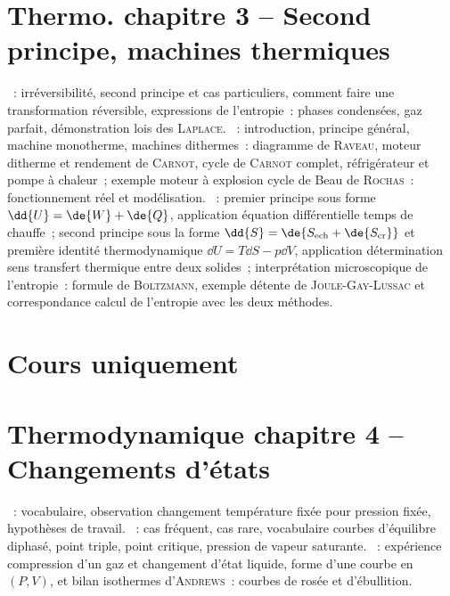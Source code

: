 \documentclass[a4paper, 12pt, final, garamond]{book}
\begin{document}
\section*{Thermo. chapitre 3 -- Second principe, machines thermiques}
\begin{enumerate}[label=\Roman*]
  ~: irréversibilité, second principe et cas particuliers,
    comment faire une transformation réversible, expressions de l'entropie~:
    phases condensées, gaz parfait, démonstration lois des \textsc{Laplace}.
  ~: introduction, principe général, machine
    monotherme, machines dithermes~: diagramme de \textsc{Raveau}, moteur
    ditherme et rendement de \textsc{Carnot}, cycle de \textsc{Carnot} complet,
    réfrigérateur et pompe à chaleur~; exemple moteur à explosion cycle de Beau
    de \textsc{Rochas}~: fonctionnement réel et modélisation.
  ~: premier
    principe sous forme $\dd{U} = \de{W}+\de{Q}$, application équation
    différentielle temps de chauffe~; second principe sous la forme $\dd{S} =
    \de{S_{\rm ech}+\de{S_{\rm cr}}}$ et première identité thermodynamique
    $\dd{U} = T\dd{S} - p\dd{V}$, application détermination sens transfert
    thermique entre deux solides~; interprétation microscopique de l'entropie~:
    formule de \textsc{Boltzmann}, exemple détente de \textsc{Joule-Gay-Lussac}
    et correspondance calcul de l'entropie avec les deux méthodes.
\end{enumerate}

\section{Cours uniquement}

\section*{Thermodynamique chapitre 4 -- Changements d'états}
\begin{enumerate}[label=\Roman*]
  ~: vocabulaire, observation changement température fixée
    pour pression fixée, hypothèses de travail.
  ~: cas fréquent, cas rare, vocabulaire courbes
    d'équilibre diphasé, point triple, point critique, pression de vapeur
    saturante.
  ~: expérience compression d'un gaz et
    changement d'état liquide, forme d'une courbe en $(P,V)$, et bilan
    isothermes d'\textsc{Andrews}~: courbes de rosée et d'ébullition.
\end{enumerate}
\end{document}
